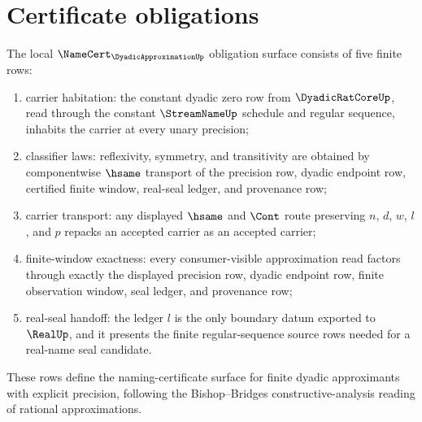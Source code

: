 \section{Certificate obligations}
\label{sec:dyadicapproximation-certificate-obligations}

\begin{theorem}
\label{thm:dyadic-approximation-window-obligations}
The local $\NameCert_{\DyadicApproximationUp}$ obligation surface consists of five finite rows:
\begin{enumerate}
\item carrier habitation: the constant dyadic zero row from $\DyadicRatCoreUp$, read through the constant $\StreamNameUp$ schedule and regular sequence, inhabits the carrier at every unary precision;
\item classifier laws: reflexivity, symmetry, and transitivity are obtained by componentwise $\hsame$ transport of the precision row, dyadic endpoint row, certified finite window, real-seal ledger, and provenance row;
\item carrier transport: any displayed $\hsame$ and $\Cont$ route preserving $n$, $d$, $w$, $l$, and $p$ repacks an accepted carrier as an accepted carrier;
\item finite-window exactness: every consumer-visible approximation read factors through exactly the displayed precision row, dyadic endpoint row, finite observation window, seal ledger, and provenance row;
\item real-seal handoff: the ledger $l$ is the only boundary datum exported to $\RealUp$, and it presents the finite regular-sequence source rows needed for a real-name seal candidate.
\end{enumerate}
These rows define the naming-certificate surface for finite dyadic approximants with explicit precision, following the Bishop--Bridges constructive-analysis reading of rational approximations.
\end{theorem}
